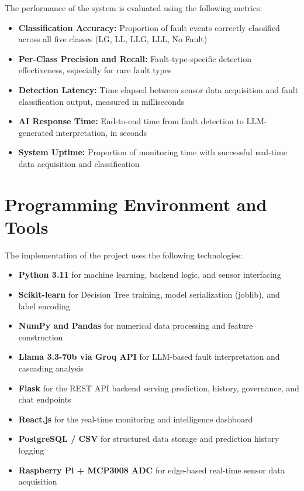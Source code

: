 The performance of the system is evaluated using the following metrics:
\begin{itemize}
\setlength{\itemsep}{0pt}
\setlength{\parskip}{0pt}
\setlength{\parsep}{0pt}
\item \textbf{Classification Accuracy:} Proportion of fault events correctly classified across all five classes (LG, LL, LLG, LLL, No Fault)
\item \textbf{Per-Class Precision and Recall:} Fault-type-specific detection effectiveness, especially for rare fault types
\item \textbf{Detection Latency:} Time elapsed between sensor data acquisition and fault classification output, measured in milliseconds
\item \textbf{AI Response Time:} End-to-end time from fault detection to LLM-generated interpretation, in seconds
\item \textbf{System Uptime:} Proportion of monitoring time with successful real-time data acquisition and classification
\end{itemize}

\pagebreak
\section{Programming Environment and Tools}

The implementation of the project uses the following technologies:
\begin{itemize}
\setlength{\itemsep}{0pt}
\setlength{\parskip}{0pt}
\setlength{\parsep}{0pt}
\item \textbf{Python 3.11} for machine learning, backend logic, and sensor interfacing
\item \textbf{Scikit-learn} for Decision Tree training, model serialization (joblib), and label encoding
\item \textbf{NumPy and Pandas} for numerical data processing and feature construction
\item \textbf{Llama 3.3-70b via Groq API} for LLM-based fault interpretation and cascading analysis
\item \textbf{Flask} for the REST API backend serving prediction, history, governance, and chat endpoints
\item \textbf{React.js} for the real-time monitoring and intelligence dashboard
\item \textbf{PostgreSQL / CSV} for structured data storage and prediction history logging
\item \textbf{Raspberry Pi + MCP3008 ADC} for edge-based real-time sensor data acquisition
\end{itemize}

